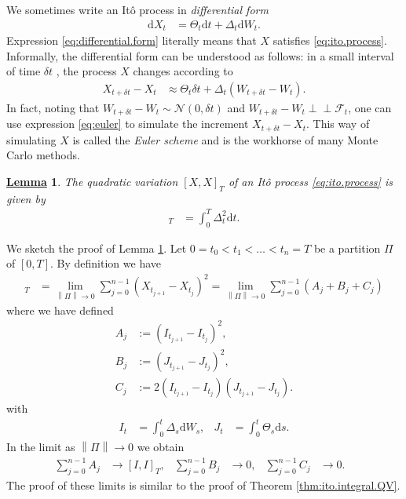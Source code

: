 \documentclass[12pt]{book}
\numberwithin{equation}{chapter}
\theoremstyle{plain}
\numberwithin{theorem}{section}
\newtheorem{lemma}[theorem]{\underline{Lemma}}   		%
\theoremstyle{definition}
\numberwithin{exercise}{chapter}
\let\oldendproof\endproof
\renewenvironment{proof}[1][\proofname]{%
  \oldproof[\scshape\underline{#1}]%
}{\oldendproof}
\newcommand{\<}{\langle}
\renewcommand{\>}{\rangle}
\renewcommand{\(}{\left(}
\renewcommand{\)}{\right)}
\renewcommand{\[}{\left[}
\renewcommand{\]}{\right]}
\newcommand\Fc{\mathscr{F}}
\newcommand\Nc{\mathscr{N}}
\newcommand\del{\delta}
\newcommand\Del{\Delta}
\newcommand{\ind}{\perp \! \! \! \perp}
\newcommand\dd{\mathrm{d}}
\newcommand{\norm}[1]{\left\|#1\right\|}
\begin{document}
\noindent
We sometimes write an It\^o process in \emph{differential form}
\begin{align}
\dd X_t
	&=	\Theta_t \dd t + \Del_t \dd W_t . \label{eq:differential.form}
\end{align}
Expression \eqref{eq:differential.form} literally means that $X$ satisfies \eqref{eq:ito.process}.  Informally, the differential form can be understood as follows: in a small interval of time $\del t$ , the process $X$ changes according to
\begin{align}
X_{t + \del t} - X_t
	&\approx	\Theta_t \del t + \Del_t \( W_{t+\del t} - W_t \) . \label{eq:euler}
\end{align}
In fact, noting that $W_{t+\del t} - W_t \sim \Nc(0,\del t)$ and $W_{t+\del t} - W_t \ind \Fc_t$, one can use expression \eqref{eq:euler} to simulate the increment $X_{t + \del t} - X_t$.  This way of simulating $X$ is called the \emph{Euler scheme} and is the workhorse of many Monte Carlo methods.

\begin{lemma}
\label{lem:ito.process.QV}
The quadratic variation $[X,X]_T$ of an It\^o process \eqref{eq:ito.process} is given by
\begin{align}
[X,X]_T
	&=	\int_0^T \Del_t^2 \dd t .
\end{align}
\end{lemma}

\begin{proof}
We sketch the proof of Lemma \ref{lem:ito.process.QV}.
Let $0 = t_0 < t_1 < \ldots < t_n = T$ be a partition $\Pi$ of $[0,T]$.  By definition we have
\begin{align}
[X,X]_T
	&=	\lim_{\norm{\Pi}\to 0} \sum_{j=0}^{n-1} \( X_{t_{j+1}} - X_{t_j}\)^2 
	=		\lim_{\norm{\Pi}\to 0} \sum_{j=0}^{n-1} \( A_j + B_j + C_j \)
\end{align}
where we have defined
\begin{align}
A_j
	&:=	 \( I_{t_{j+1}} - I_{t_j} \)^2 , \\
B_j
	&:= \( J_{t_{j+1}} - J_{t_j} \)^2 , \\
C_j
	&:=	2 \( I_{t_{j+1}} - I_{t_j} \) \( J_{t_{j+1}} - J_{t_j} \)   .
\end{align}
with
\begin{align}
I_t
	&=	\int_0^t \Del_s \dd W_s , &
J_t
	&=	\int_0^t \Theta_s \dd s .
\end{align}
In the limit as $\norm{ \Pi } \to 0$ we obtain
\begin{align}
\sum_{j=0}^{n-1} A_j
	& \to [I,I]_T , &
\sum_{j=0}^{n-1} B_j
	& \to 0 , &
	\sum_{j=0}^{n-1} C_j
	& \to 0 . &
\end{align}
The proof of these limits is similar to the proof of Theorem \ref{thm:ito.integral.QV}.
\end{proof}
\end{document}
